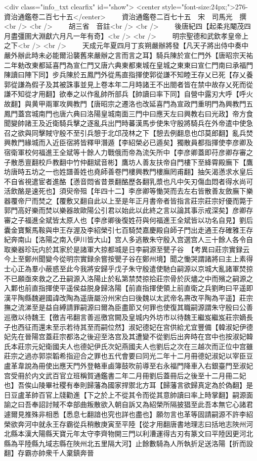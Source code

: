 <div class="info_txt clearfix" id="show">
<center style="font-size:24px;">276-資治通鑑卷二百七十五</center>
  　　資治通鑑卷二百七十五　宋　司馬光　撰<br />
<br />
　　胡三省　音註<br />
<br />
　　後唐紀四【起柔兆閹茂四月盡彊圉大淵獻六月凡一年有奇】<br />
<br />
　　明宗聖德和武欽孝皇帝上之下<br />
<br />
　　天成元年夏四月丁亥朔嚴辦將發【凡天子將出侍中奏中嚴外辦此時未必能爾沿襲舊來嚴辦之言而言之耳】騎兵陳於宣仁門外【唐昭宗天祐二年勅改東都延喜門為宣仁門又唐六典東都東城在皇城之東東曰宣仁門南曰承福門陳讀曰陣下同】步兵陳於五鳳門外從馬直指揮使郭從謙不知睦王存乂已死【存乂養郭從謙為假子及其被誅事並見上卷本年二月時諸王不出閤者皆在禁中故存乂死而從謙不知從才用翻】欲奉之以作亂帥所部兵【帥讀曰率下同】自營中露刃大呼【呼火故翻】與黄甲兩軍攻興教門【唐昭宗之遷洛也改延喜門為宣政門重明門為興教門五鳳門蓋宫城南門也唐六典曰洛陽皇城南面三門中曰應天左曰興教右曰光政】帝方食聞變帥諸王及近衛騎兵擊之逐亂兵出門時蕃漢馬步使朱守殷將騎兵在外帝遣中使急召之欲與同擊賊守殷不至引兵憩于北邙茂林之下【憩去例翻息也邙莫郎翻】亂兵焚興教門緣城而入近臣宿將皆釋甲潛遁【李紹榮必已遁矣】獨散員都指揮使李彦卿及宿衛軍校何福進王全斌等十餘人力戰俄而帝為流矢所中【李彦卿蓋即苻彦卿存審之子散悉亶翻校戶教翻中竹仲翻斌音彬】鷹坊人善友扶帝自門樓下至絳霄殿廡下【鷹坊唐時五坊之一也姓譜善姓也堯師善卷門樓興教門樓廡罔甫翻】抽矢渴懣求水皇后不自省視遣宦者進酪【懣音悶省昔景翻酪歷各翻乳漿也凡中矢刃傷血悶者得水尚可活飲酪是速死也】須臾帝殂【年四十二】李彦卿等慟哭而去左右皆散善友斂廡下樂器覆帝尸而焚之【覆敷又翻自此以上至是年正月書帝者皆指言莊宗莊宗好優而斃于郭門高好樂而焚以樂器故歐陽公引君以始此以此終之言以論其事示戒深矣】彦卿存審之子福進全斌皆太原人也【李彦卿後復姓苻與何福進王全斌皆以功名自見】劉后囊金寶繫馬鞍與申王存渥及李紹榮引七百騎焚嘉慶殿自師子門出走通王存確雅王存紀奔南山【洛陽之南入伊川皆大山】宫人多逃散朱守殷入宫選宫人三十餘人各令自取樂器珍玩内於其家於是諸軍大掠都城是日李嗣源至甖子谷　【考異曰莊宗實録云今上至鄭州聞變今從明宗實録余嘗按甖子谷在鄭州境】聞之慟哭謂諸將曰主上素得士心正為羣小蔽惑至此今我將安歸乎戊子朱守殷遣使馳白嗣源以京城大亂諸軍焚掠不已願亟來救之乙丑嗣源入洛陽止於私第禁焚掠拾莊宗骨於灰燼之中而殯之嗣源之入鄴也前直指揮使平遥侯益脱身歸洛陽【前直指揮使領上前直衛之兵劉昫曰平遥即漢平陶縣魏避國諱改陶為遥唐屬汾州宋白曰後魏以太武帝名燾改平陶為平遥】莊宗撫之流涕至是益自縛請罪嗣源曰爾為臣盡節又何罪也使復其職嗣源謂朱守殷曰公善巡徼以待魏王【徼吉弔翻言善巡徼宫闕及皇城内外坊市以待魏王繼岌繼岌莊宗嫡長子也西征而還未至示若待其至而嗣位然】淑妃德妃在宫供給尤宜豐備【韓淑妃伊德妃先在晉陽宫蓋莊宗都洛之後迎至洛宫及其遭變不從劉后出奔時在宫中也按淑妃韓氏本莊宗元妃衛國夫人也德妃伊氏次妃燕國夫人也劉后之次在三越次而正位中宫雖莊宗之過亦郭崇韜希指迎合之罪也五代會要曰同光二年十二月冊德妃淑妃以宰臣豆盧革韋說為冊使出應天門外登輅車鹵簿鼓吹前導至右永福門降車入右銀臺門至淑妃宫受冊於内文武百官立班稱賀通鑑書二年二月冊劉后蓋冊后之後至十二月冊二妃也】吾俟山陵畢社稷有奉則歸藩為國家捍禦北方耳【歸藩言欲歸真定為於偽翻】是日豆盧革帥百官上牋勸進【下之於上不從其令而從其意帥讀曰率上時掌翻】嗣源面諭之曰吾奉詔討賊不幸部曲叛散欲入朝自訴又為紹榮所隔披猖至此吾本無它心諸君遽爾見推殊非相悉【悉息七翻諳也究也詳也盡也】願勿言也革等固請嗣源不許李紹榮欲奔河中就永王存霸從兵稍散庚寅至平陸【從才用翻唐書地理志曰括地志陜州河北縣本漢大陽縣天寶元年太守李齊物開三門以利漕運得古刃有篆文曰平陸因更河北縣為平陸縣九域志縣在陜州北五里隔大河】止餘數騎為人所執折足送洛陽【折而設翻】存霸亦帥衆千人棄鎮奔晉